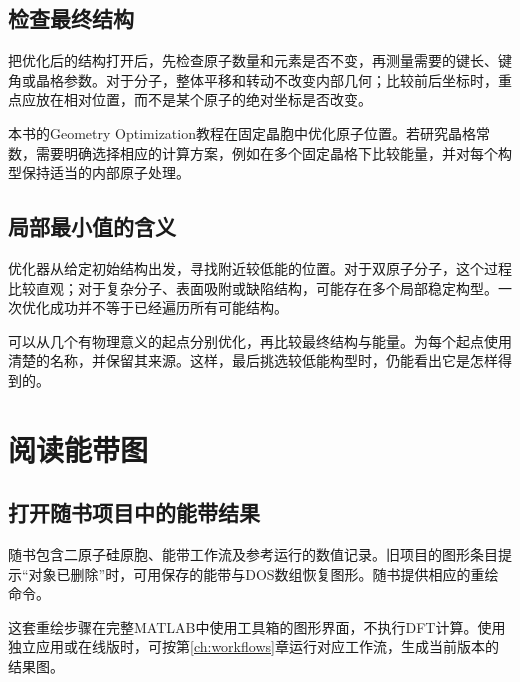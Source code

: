\subsection{检查最终结构}

把优化后的结构打开后，先检查原子数量和元素是否不变，再测量需要的键长、键角或晶格参数。对于分子，整体平移和转动不改变内部几何；比较前后坐标时，重点应放在相对位置，而不是某个原子的绝对坐标是否改变。

本书的Geometry Optimization教程在固定晶胞中优化原子位置。若研究晶格常数，需要明确选择相应的计算方案，例如在多个固定晶格下比较能量，并对每个构型保持适当的内部原子处理。

\subsection{局部最小值的含义}

优化器从给定初始结构出发，寻找附近较低能的位置。对于双原子分子，这个过程比较直观；对于复杂分子、表面吸附或缺陷结构，可能存在多个局部稳定构型。一次优化成功并不等于已经遍历所有可能结构。

可以从几个有物理意义的起点分别优化，再比较最终结构与能量。为每个起点使用清楚的名称，并保留其来源。这样，最后挑选较低能构型时，仍能看出它是怎样得到的。

\section{阅读能带图}

\subsection{打开随书项目中的能带结果}

随书包含二原子硅原胞、能带工作流及参考运行的数值记录。旧项目的图形条目提示“对象已删除”时，可用保存的能带与DOS数组恢复图形。随书提供相应的重绘命令。

这套重绘步骤在完整MATLAB\regmark{}中使用工具箱的图形界面，不执行DFT计算。使用独立应用或在线版时，可按第\ref{ch:workflows}章运行对应工作流，生成当前版本的结果图。

